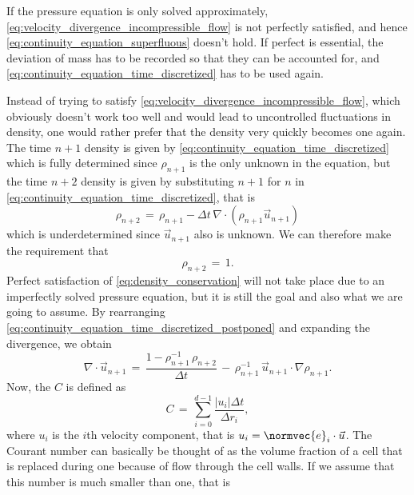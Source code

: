 If the pressure equation is only solved approximately, \eqref{eq:velocity_divergence_incompressible_flow} is not perfectly satisfied, and hence \eqref{eq:continuity_equation_superfluous} doesn't hold. If perfect  is essential, the deviation of mass has to be recorded so that they can be accounted for, and \eqref{eq:continuity_equation_time_discretized} has to be used again.

Instead of trying to satisfy \eqref{eq:velocity_divergence_incompressible_flow}, which obviously doesn't work too well and would lead to uncontrolled fluctuations in density, one would rather prefer that the density very quickly becomes one again. The time $n+1$ density is given by \eqref{eq:continuity_equation_time_discretized} which is fully determined since $\rho_{n+1}$ is the only unknown in the equation, but the time $n+2$ density is given by substituting $n+1$ for $n$ in \eqref{eq:continuity_equation_time_discretized}, that is
%
\begin{equation} \label{eq:continuity_equation_time_discretized_postponed}
\rho_{n+2} \,=\, \rho_{n+1} - \Delta t\,\nabla\cdot(\rho_{n+1}\vec{u}_{n+1})
\end{equation}
%
which is underdetermined since $\vec{u}_{n+1}$ also is unknown. We can therefore make the requirement that
%
\begin{equation} \label{eq:density_conservation}
\rho_{n+2} \,=\, 1.
\end{equation}
%
Perfect satisfaction of \eqref{eq:density_conservation} will not take place due to an imperfectly solved pressure equation, but it is still the goal and also what we are going to assume. By rearranging \eqref{eq:continuity_equation_time_discretized_postponed} and expanding the divergence, we obtain
%
\begin{equation} \label{eq:velocity_divergence_density_conservation_premature}
\nabla\cdot\vec{u}_{n+1} \,=\, \frac{1-\rho_{n+1}^{-1}\,\rho_{n+2}}{\Delta t} \,-\, \rho_{n+1}^{-1}\,\vec{u}_{n+1}\cdot\nabla\rho_{n+1}.
\end{equation}
%
Now, the  $C$ is defined as
%
\begin{equation}
C \,=\, \sum_{i=0}^{d-1} \frac{|u_i|\Delta t}{\Delta r_i},
\end{equation}
%
where $u_i$ is the $i$th velocity component, that is $u_i = \normvec{e}_i\cdot\vec{u}$. The Courant number can basically be thought of as the volume fraction of a cell that is replaced during one \timestep because of flow through the cell walls. If we assume that this number is much smaller than one, that is
